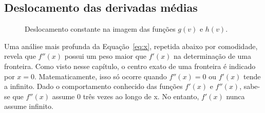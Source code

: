 	
\subsection{Deslocamento das derivadas médias}

\begin{figure}[h]
	\centering
	\caption{Deslocamento constante na imagem das funções $ g(v) $ e $ h(v) $.}
	\label{fig:g_shift}
\end{figure}

    Uma análise mais profunda da Equação~\eqref{eq:x}, repetida abaixo por comodidade, revela que $ f''(x) $ possui um peso maior que $ f'(x) $ na determinação de uma fronteira. Como visto nesse capítulo, o centro exato de uma fronteira é indicado por $ x = 0 $. Matematicamente, isso só ocorre quando $ f''(x) = 0 $ ou $ f'(x) $ tende a infinito. Dado o comportamento conhecido das funções $ f'(x) $ e $ f''(x) $, sabe-se que $ f''(x) $ assume $ 0 $ três vezes ao longo de x. No entanto, $ f'(x) $ nunca assume infinito.
    
